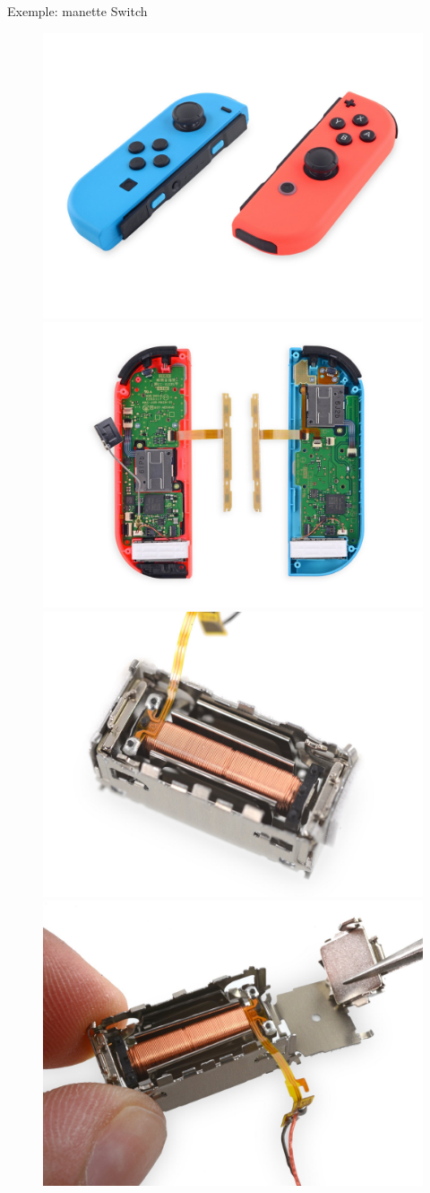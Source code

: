 {
\begin{frame}{Exemple: manette Switch}
\begin{figure}
\centering
\includegraphics[width=0.4\linewidth]{images/switch1}
\includegraphics[width=0.4\linewidth]{images/switch2}
\includegraphics[width=0.4\linewidth]{images/HDRumble1}
\includegraphics[width=0.4\linewidth]{images/HDRumble2}
\end{figure}
\end{frame}
}

